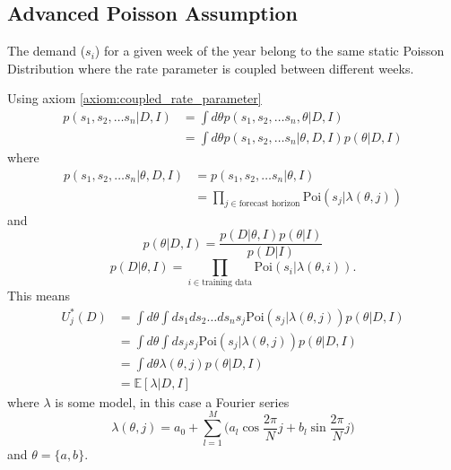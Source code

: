 \subsection{Advanced Poisson Assumption}

\begin{axiom}
	\label{axiom:coupled_rate_parameter}
	The demand ($s_i$) for a given week of the year belong to the same static Poisson Distribution where the rate parameter is coupled between different weeks.
\end{axiom}

Using axiom \ref{axiom:coupled_rate_parameter}
\begin{equation}
	\begin{split}
		p(s_1,s_2,\dots s_n| D,I) &= \int d\theta p(s_1,s_2,\dots s_n,\theta|D,I)\\
		& = \int d\theta p(s_1,s_2,\dots s_n|\theta,D,I)p(\theta|D,I)
	\end{split}
\end{equation}
where
\begin{equation}
	\begin{split}
		p(s_1,s_2,\dots s_n|\theta,D,I) &= p(s_1,s_2,\dots s_n|\theta,I)\\
		& = \prod_{j\in \text{forecast horizon}}\text{Poi}(s_j|\lambda(\theta,j))
	\end{split}
\end{equation}
and
\begin{equation}
	p(\theta|D,I) = \frac{p(D|\theta,I)p(\theta|I)}{p(D|I)}
\end{equation}
\begin{equation}
	p(D|\theta,I) = \prod_{i\in \text{training data}} \text{Poi}(s_i|\lambda(\theta,i)).
\end{equation}
This means
\begin{equation}
	\begin{split}
		U^*_j(D) &= \int d\theta\int ds_1ds_2\dots ds_n s_j\text{Poi}(s_j|\lambda(\theta,j))p(\theta|D,I)\\
		& = \int d\theta \int ds_js_j \text{Poi}(s_j|\lambda(\theta,j))p(\theta|D,I)\\
		& = \int d\theta \lambda(\theta,j) p(\theta|D,I)\\
		& = \mathbb{E}[\lambda|D,I]
	\end{split}
	\label{eq:decision_rule3}
\end{equation}
where $\lambda$ is some model, in this case a Fourier series
\begin{equation}
	\lambda(\theta,j) = a_0+\sum_{l=1}^{M}\bigg(a_l\cos\frac{2\pi}{N}j+b_l\sin\frac{2\pi}{N}j\bigg)
\end{equation}
and $\theta=\{a,b\}$.


